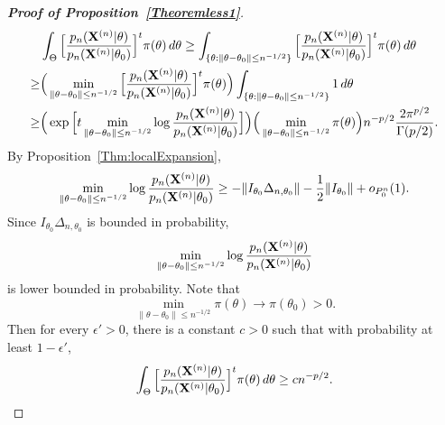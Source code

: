 \documentclass[3p]{elsarticle}
\theoremstyle{plain}
\theoremstyle{definition}
\theoremstyle{remark}
\begin{document}
\begin{appendices}
\begin{proof}[\textbf{Proof of Proposition~\ref{Theoremless1}}]
$$\begin{aligned}
        & \int_{\Theta}\Big[\frac{p_n(\mathbf{X}^{(n)}|\theta)}{p_n(\mathbf{X}^{(n)}|\theta_0)}\Big]^{t} \pi(\theta)\, d\theta
        \geq
        \int_{\{\theta:\|\theta-\theta_0\|\leq n^{-1/2}\}}\Big[\frac{p_n(\mathbf{X}^{(n)}|\theta)}{p_n(\mathbf{X}^{(n)}|\theta_0)}\Big]^{t} \pi(\theta)\, d\theta
        \\
        \geq &
        \Big(
        \min_{\|\theta-\theta_0\|\leq n^{-1/2}} 
\Big[\frac{p_n(\mathbf{X}^{(n)}|\theta)}{p_n(\mathbf{X}^{(n)}|\theta_0)}\Big]^{t} \pi(\theta)
        \Big)
        \int_{\{\theta:\|\theta-\theta_0\|\leq n^{-1/2}\}}1\, d\theta\\
        \geq&
        \Big(
        \exp
\Big[
        t\min_{\|\theta-\theta_0\|\leq n^{-1/2}} 
        \log\frac{p_n(\mathbf{X}^{(n)}|\theta)}{p_n(\mathbf{X}^{(n)}|\theta_0)}
        \Big]
        \Big)
        \Big(\min_{\|\theta-\theta_0\|\leq n^{-1/2}} 
        \pi(\theta)
        \Big)
        n^{-p/2}\frac{2\pi^{p/2}}{\Gamma(p/2)}.
    \end{aligned}
    $$
    By Proposition~\ref{Thm:localExpansion},
    $$
   \begin{aligned} 
        \min_{\|\theta-\theta_0\|\leq n^{-1/2}} 
        \log\frac{p_n(\mathbf{X}^{(n)}|\theta)}{p_n(\mathbf{X}^{(n)}|\theta_0)}
        \geq
        -\|I_{\theta_0}\Delta_{n,\theta_0}\|-\frac{1}{2}\|I_{\theta_0}\|+
        o_{P^n_0}(1).
   \end{aligned}
    $$
    Since 
    $I_{\theta_0}\Delta_{n,\theta_0}$
    is bounded in probability, 
    $$\min_{\|\theta-\theta_0\|\leq n^{-1/2}} 
        \log\frac{p_n(\mathbf{X}^{(n)}|\theta)}{p_n(\mathbf{X}^{(n)}|\theta_0)}
    $$ is lower bounded in probability.
    Note that 
    $$\min_{\|\theta-\theta_0\|\leq n^{-1/2}} \pi(\theta)\to \pi(\theta_0)>0.$$
    Then for every $\epsilon'>0$, there is a constant $c>0$ such that with probability at least $1-\epsilon'$,
    $$
         \int_{\Theta}\Big[\frac{p_n(\mathbf{X}^{(n)}|\theta)}{p_n(\mathbf{X}^{(n)}|\theta_0)}\Big]^{t} \pi(\theta)\, d\theta\geq c n^{-p/2}.
    $$







\end{proof}
\end{appendices}
\end{document}
